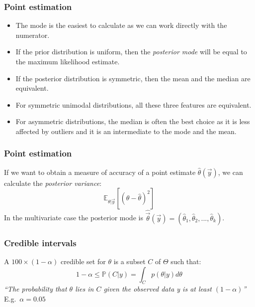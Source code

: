 \documentclass{beamer}
\renewcommand{\P}{\mathbb{P}}
\newcommand{\E}{\mathbb{E}}
\newcommand{\1}{\ensuremath{\mathbf{1}}}
\begin{document}
\begin{frame}\frametitle{Point estimation}
	\begin{itemize}
		\item The mode is the easiest to calculate as we can work directly with the numerator.
		\item If the prior distribution is uniform, then the \emph{posterior mode} will be equal to the maximum likelihood estimate.
		\item If the posterior distribution is symmetric, then the mean and the median are equivalent.
		\item For symmetric unimodal distributions, all these three features are equivalent.
		\item For asymmetric distributions, the median is often the best choice as it is less affected by outliers and it is an intermediate to the mode and the mean.
	\end{itemize}
\end{frame}
%
%
%
\begin{frame}\frametitle{Point estimation}
	If we want to obtain a measure of accuracy of a point estimate $\hat\theta(\vec{y})$, we can calculate the \emph{posterior variance}:
	\begin{equation}
		\E_{\theta|\vec{y}}[(\theta-\hat\theta)^2]
	\end{equation}
	In the multivariate case the posterior mode is $\hat{\vec{\theta}}(\vec{y}) = (\hat\theta_1,\hat\theta_2,...,\hat\theta_k)$.
\end{frame}
%
%
%
\begin{frame}\frametitle{Credible intervals}
	A $100\times(1-\alpha)$ credible set for $\theta$ is a subset $C$ of $\Theta$ such that:
	\begin{equation}
		1 - \alpha \leq \P(C|y) = \int_C p(\theta|y) d\theta
	\end{equation}
	\emph{``The probability that $\theta$ lies in $C$ given the observed data y is at least $(1 - \alpha)$''}\\[1.5ex]
	E.g.\ $\alpha = 0.05$
\end{frame}
%
%
%
\end{document}
